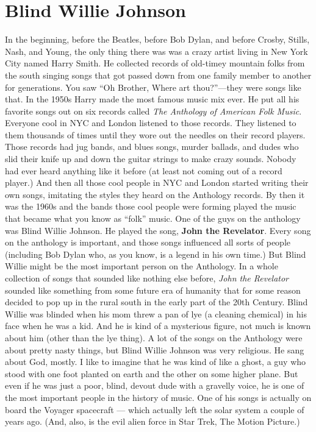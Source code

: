 \documentclass[letterpaper,single]{article}
\begin{document}
\section{Blind Willie Johnson}
In the beginning, before the Beatles, before Bob Dylan, and before Crosby, Stills, Nash, and Young, the only thing there was was a crazy artist living in New York City named Harry Smith. 
He collected records of old-timey mountain folks from the south singing songs that got passed down from one family member to another for generations. 
You saw ``Oh Brother, Where art thou?''---they were songs like that. 
In the 1950s Harry made the most famous music mix ever. 
He put all his favorite songs out on six records called \emph{The Anthology of American Folk Music}. 
Everyone cool in NYC and London listened to those records.
They listened to them thousands of times until they wore out the needles on their record players. 
Those records had jug bands, and blues songs, murder ballads, and dudes who slid their knife up and down the guitar strings to make crazy sounds.
Nobody had ever heard anything like it before (at least not coming out of a record player.)
And then all those cool people in NYC and London started writing their own songs, imitating the styles they heard on the Anthology records. 
By then it was the 1960s and the bands those cool people were forming played the music that became what you know as ``folk'' music.
One of the guys on the anthology was Blind Willie Johnson. He played the song, \textbf{John the Revelator}. 
Every song on the anthology is important, and those songs influenced all sorts of people (including Bob Dylan who, as you know, is a legend in his own time.)
But Blind Willie might be the most important person on the Anthology. In a whole collection of songs that sounded like nothing else before, \emph{John the Revelator} sounded like something from some future era of humanity that for some reason decided to pop up in the rural south in the early part of the 20th Century.
Blind Willie was blinded when his mom threw a pan of lye (a cleaning chemical) in his face when he was a kid.
And he is kind of a mysterious figure, not much is known about him (other than the lye thing).
A lot of the songs on the Anthology were about pretty nasty things, but Blind Willie Johnson was very religious. He sang about God, mostly.
I like to imagine that he was kind of like a ghost, a guy who stood with one foot planted on earth and the other on some higher plane.
But even if he was just a poor, blind, devout dude with a gravelly voice, he is one of the most important people in the history of music.
One of his songs is actually on board the Voyager spacecraft --- which actually left the solar system a couple of years ago. (And, also, is the evil alien force in Star Trek, The Motion Picture.)
\end{document}
